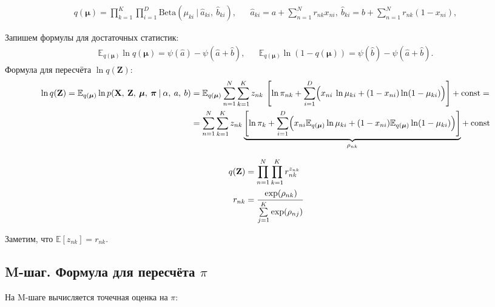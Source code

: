 \documentclass[twoside]{article}
\begin{document}
	\begin{align*}\label{eq_12}
	q(\boldsymbol{\mu}) = \prod_{k = 1}^K  \prod_{i = 1}^D \mathrm{Beta}(\mu_{ki} \:|\: \hat a_{ki},\: \hat b_{ki}) ,&&
	\hat a_{ki} = a + \sum_{n = 1}^N r_{nk} x_{ni}, \: \hat b_{ki} = b + \sum_{n = 1}^N r_{nk} (1 - x_{ni}),
	\end{align*}
	
	Запишем формулы для достаточных статистик:
	\begin{align*}
	\mathbb{E}_{q(\boldsymbol{\mu})}\ln q(\boldsymbol{\mu}) = \psi(\hat a) -
	\psi(\hat a+\hat b), && \mathbb{E}_{q(\boldsymbol{\mu})}\ln(1 - q(\boldsymbol{\mu}) )= \psi(\hat b) -	\psi(\hat a+\hat b).
	\end{align*}
	Формула для пересчёта  $\ln q(\textbf{Z})$:
	\begin{align*}
	\ln q(\textbf{Z}) = \mathbb{E}_{q(\boldsymbol\mu)} \ln p(\textbf{X},\: \textbf{Z},\: \boldsymbol\mu,\: \boldsymbol\pi \:|\: \alpha,\: a,\: b) 
	&= \mathbb{E}_{q(\boldsymbol\mu)} \sum_{n = 1}^N  \sum_{k = 1}^K z_{nk}\: \left[ \ln\pi_{nk} +  \sum_{i = 1}^D \Bigl( x_{ni}\: \ln\mu_{ki} + (1 - x_{ni})\ln(1-\mu_{ki})\Bigr)\right] + \mathrm{const} = \\
	&= \sum_{n = 1}^N \sum_{k = 1}^K z_{nk} \underbrace{\left[\ln \pi_k +  \sum_{i = 1}^D \Bigl(x_{ni} \mathbb{E}_{q(\boldsymbol{\mu})} \ln\mu_{ki} + (1 - x_{ni}) \mathbb{E}_{q(\boldsymbol{\mu})} \ln(1 - \mu_{ki}) \Bigr)  \right]}_{\rho_{nk}} + \:\mathrm{const} 
	\end{align*}
	
	\begin{align*}
	q(\textbf{Z}) &= \prod_{n = 1}^N \prod_{k = 1}^K r_{nk}^{z_{nk}} \\
	r_{nk} &= \cfrac{\exp(\rho_{nk})}{\sum\limits_{j=1}^K \exp(\rho_{nj})}
	\end{align*}
	
	Заметим, что $\mathbb{E}[z_{nk}] = r_{nk}$.
	
\subsection{M-шаг. Формула для пересчёта $\pi$}
	На M-шаге вычисляется точечная оценка на $\pi$:
\end{document}
